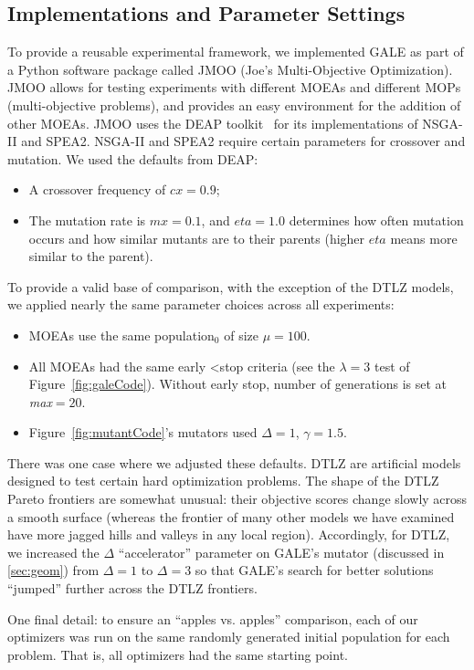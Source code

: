 \documentclass[10pt,journal,compsoc]{IEEEtran}
\newcommand{\bi}{\begin{itemize}}
\newcommand{\ei}{\end{itemize}}
\newcommand{\tion}[1]{\textsection\ref{sec:#1}}
\newcommand{\fig}[1]{Figure~\ref{fig:#1}}
\newenvironment{changed}{\par\color{MyDarkBlue}}{\par}
\begin{document}
\subsection{Implementations and Parameter Settings}\label{sec:expexp}
To provide a reusable experimental framework, we
implemented GALE as part of a Python software
package called JMOO (Joe's Multi-Objective
Optimization).  JMOO allows for
testing experiments with different MOEAs and
different MOPs (multi-objective problems), and
provides an easy environment for the addition of
other MOEAs.  
JMOO uses the DEAP
toolkit~\cite{jmlr12} for its
implementations of  NSGA-II and SPEA2.
NSGA-II and SPEA2 require certain
 parameters for crossover and
mutation. We used the defaults from  DEAP:
\bi
\item A crossover frequency of  $cx=0.9$;
\item The mutation rate is $mx=0.1$, and $eta=1.0$ determines how often
mutation occurs and how similar mutants are to their
parents (higher $eta$ means more similar to the
parent).
\ei

To provide a valid base of comparison, with the exception of the DTLZ models,
we applied nearly
the same parameter choices across all
experiments:
\bi
\item
MOEAs use the same
population$_0$ of size $\mu=100$.
\item All MOEAs had the same early
<stop criteria (see the
$\lambda=3$ test of \fig{galeCode}).
Without early stop, 
number of generations is set at {\em max}$=20$.
\item
\fig{mutantCode}'s mutators used \mbox{$\Delta=1$}, \mbox{$\gamma=1.5$}.
\ei
\begin{changed}
There was one case where we adjusted these defaults. 
DTLZ are artificial models designed to test certain hard optimization problems.
The shape of the DTLZ Pareto frontiers are somewhat unusual:
their
objective scores change slowly
across a smooth surface (whereas the frontier of
many other models we have examined have more jagged hills and valleys
in any local region). Accordingly, for DTLZ, we increased the
$\Delta$ ``accelerator'' parameter on GALE's mutator
(discussed in \tion{geom}) from $\Delta=1$ to $\Delta=3$
so that  GALE's search for better solutions
``jumped'' further across the DTLZ frontiers.

One final detail: to ensure an ``apples vs. apples'' comparison, 
each of our optimizers was run on the same randomly generated
initial population for each problem. That is, all optimizers had the same starting point.
\end{changed}
\end{document}
